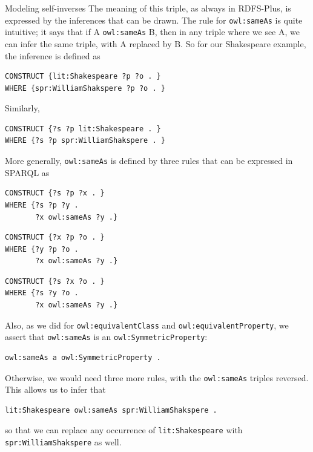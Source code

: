\begin{challenge}{Modeling self-inverses}
The meaning of this triple, as always in RDFS-Plus, is expressed by the
inferences that can be drawn. The rule for \texttt{owl:sameAs} is quite
intuitive; it says that if A \texttt{owl:sameAs} B, then in any triple where we
see A, we can infer the same triple, with A replaced by B. So for our
Shakespeare example, the inference is defined as

\begin{lstlisting}
CONSTRUCT {lit:Shakespeare ?p ?o . }
WHERE {spr:WilliamShakspere ?p ?o . }
\end{lstlisting}

Similarly,

\begin{lstlisting}
CONSTRUCT {?s ?p lit:Shakespeare . }
WHERE {?s ?p spr:WilliamShakspere . }
\end{lstlisting}

More generally, \texttt{owl:sameAs} is defined by three rules that can be
expressed in SPARQL as

\begin{lstlisting}
CONSTRUCT {?s ?p ?x . }
WHERE {?s ?p ?y .
       ?x owl:sameAs ?y .}
\end{lstlisting}

\begin{lstlisting}
CONSTRUCT {?x ?p ?o . }
WHERE {?y ?p ?o .
       ?x owl:sameAs ?y .} 
\end{lstlisting}

\begin{lstlisting}
CONSTRUCT {?s ?x ?o . }
WHERE {?s ?y ?o .
       ?x owl:sameAs ?y .}
\end{lstlisting}

Also, as we did for \texttt{owl:equivalentClass} and \texttt{owl:equivalentProperty}, we
assert that \texttt{owl:sameAs} is an \texttt{owl:SymmetricProperty}:

\begin{lstlisting}
owl:sameAs a owl:SymmetricProperty .
\end{lstlisting}

Otherwise, we would need three more rules, with the \texttt{owl:sameAs} triples
reversed. This allows us to infer that

\begin{lstlisting}
lit:Shakespeare owl:sameAs spr:WilliamShakspere .
\end{lstlisting}

so that we can replace any occurrence of \texttt{lit:Shakespeare} with
\texttt{spr:WilliamShakspere}
as well.


\end{challenge}
